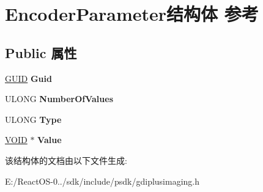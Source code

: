 \hypertarget{struct_encoder_parameter}{}\section{Encoder\+Parameter结构体 参考}
\label{struct_encoder_parameter}
\subsection*{Public 属性}
\begin{DoxyCompactItemize}
\item 
\mbox{\label{struct_encoder_parameter_ae7a07ef4531af6baaf158c00a0b88c5e}} 
\hyperlink{interface_g_u_i_d}{G\+U\+ID} {\bfseries Guid}
\item 
\mbox{\label{struct_encoder_parameter_aa0cafa52da35a9d0a99ebfd10c349327}} 
U\+L\+O\+NG {\bfseries Number\+Of\+Values}
\item 
\mbox{\label{struct_encoder_parameter_ab8cc9dabcf0b7e437fb0df060902ef2a}} 
U\+L\+O\+NG {\bfseries Type}
\item 
\mbox{\label{struct_encoder_parameter_a7ff6f7f558c919c69f14e738b95bd600}} 
\hyperlink{interfacevoid}{V\+O\+ID} $\ast$ {\bfseries Value}
\end{DoxyCompactItemize}


该结构体的文档由以下文件生成\+:\begin{DoxyCompactItemize}
\item 
E\+:/\+React\+O\+S-\/0../sdk/include/psdk/gdiplusimaging.\+h\end{DoxyCompactItemize}
